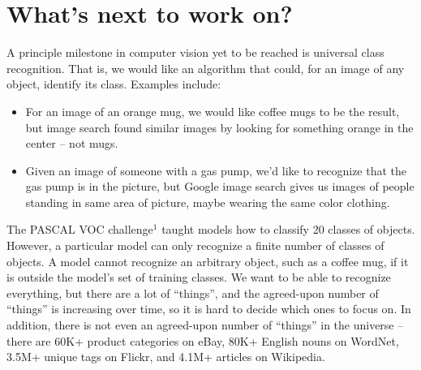 \documentclass[11pt]{article}
\begin{document}
\section{What's next to work on?} 
A principle milestone in computer vision yet to be reached is universal class recognition. That is, we would like an algorithm that could, for an image of any object, identify its class.
Examples include:
\begin{itemize}
	\item For an image of an orange mug, we would like coffee mugs to be the result, but image search found similar images by looking for something orange in the center – not mugs.
    \item Given an image of someone with a gas pump, we'd like to recognize that the gas pump is in the picture, but Google image search gives us images of people standing in same area of picture, maybe wearing the same color clothing.
    \end{itemize}
The PASCAL VOC challenge$^1$ taught models how to classify 20 classes of objects.
However, a particular model can only recognize a finite number of classes of objects. A model cannot recognize an arbitrary object, such as a coffee mug, if it is outside the model's set of training classes. We want to be able to recognize everything, but there are a lot of ``things'', and the agreed-upon number of ``things'' is increasing over time, so it is hard to decide which ones to focus on. In addition, there is not even an agreed-upon number of ``things'' in the universe -- there are 60K+ product categories on eBay, 80K+ English nouns on WordNet, 3.5M+ unique tags on Flickr, and 4.1M+ articles on Wikipedia.\\
\end{document}

